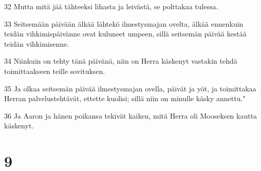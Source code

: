 \par 32 Mutta mitä jää tähteeksi lihasta ja leivästä, se polttakaa tulessa.
\par 33 Seitsemään päivään älkää lähtekö ilmestysmajan ovelta, älkää ennenkuin teidän vihkimispäivänne ovat kuluneet umpeen, sillä seitsemän päivää kestää teidän vihkimisenne.
\par 34 Niinkuin on tehty tänä päivänä, niin on Herra käskenyt vastakin tehdä toimittaakseen teille sovituksen.
\par 35 Ja olkaa seitsemän päivää ilmestysmajan ovella, päivät ja yöt, ja toimittakaa Herran palvelustehtävät, ettette kuolisi; sillä niin on minulle käsky annettu."
\par 36 Ja Aaron ja hänen poikansa tekivät kaiken, mitä Herra oli Mooseksen kautta käskenyt.

\chapter{9}

